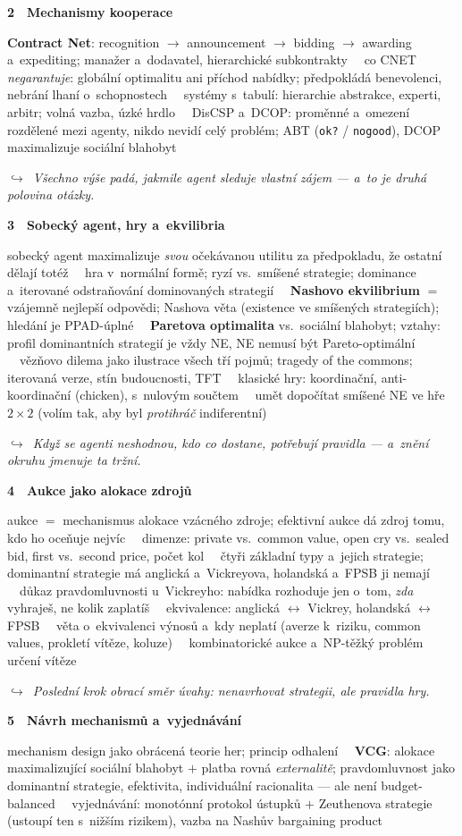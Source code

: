 \documentclass[11pt,a4paper]{article}
\newcommand{\tb}{\ \textcolor{defframe}{\textbullet}\ }
\newcommand{\blok}[2]{\par\addvspace{2.4mm}\noindent
  \textcolor{blokcol}{\textbf{#1}}\ \ \textbf{#2}\par\nobreak}
\newcommand{\tema}[1]{\par\nobreak\noindent #1\par}
\newcommand{\most}[1]{\par\nobreak\noindent
  {\small\itshape\textcolor{mostcol}{$\hookrightarrow$\ #1}}\par}
\begin{document}
\blok{2}{Mechanismy kooperace}
\tema{\textbf{Contract Net}: recognition $\to$ announcement $\to$ bidding $\to$ awarding
a~expediting; manažer a~dodavatel, hierarchické subkontrakty
\tb co CNET \emph{negarantuje}: globální optimalitu ani příchod nabídky; předpokládá
benevolenci, nebrání lhaní o~schopnostech
\tb systémy s~tabulí: hierarchie abstrakce, experti, arbitr; volná vazba, úzké hrdlo
\tb DisCSP a~DCOP: proměnné a~omezení rozdělené mezi agenty, nikdo nevidí celý problém;
ABT (\texttt{ok?} / \texttt{nogood}), DCOP maximalizuje sociální blahobyt}
\most{Všechno výše padá, jakmile agent sleduje vlastní zájem --- a~to je druhá polovina
otázky.}

\blok{3}{Sobecký agent, hry a~ekvilibria}
\tema{sobecký agent maximalizuje \emph{svou} očekávanou utilitu za předpokladu, že ostatní
dělají totéž
\tb hra v~normální formě; ryzí vs.\ smíšené strategie; dominance a~iterované odstraňování
dominovaných strategií
\tb \textbf{Nashovo ekvilibrium} $=$ vzájemně nejlepší odpovědi; Nashova věta (existence ve
smíšených strategiích); hledání je PPAD-úplné
\tb \textbf{Paretova optimalita} vs.\ sociální blahobyt; vztahy: profil dominantních
strategií je vždy NE, NE nemusí být Pareto-optimální
\tb vězňovo dilema jako ilustrace všech tří pojmů; tragedy of the commons; iterovaná verze,
stín budoucnosti, TFT
\tb klasické hry: koordinační, anti-koordinační (chicken), s~nulovým součtem
\tb umět dopočítat smíšené NE ve hře $2\times2$ (volím tak, aby byl \emph{protihráč}
indiferentní)}
\most{Když se agenti neshodnou, kdo co dostane, potřebují pravidla --- a~znění okruhu jmenuje
ta tržní.}

\blok{4}{Aukce jako alokace zdrojů}
\tema{aukce $=$ mechanismus alokace vzácného zdroje; efektivní aukce dá zdroj tomu, kdo ho
oceňuje nejvíc
\tb dimenze: private vs.\ common value, open cry vs.\ sealed bid, first vs.\ second price,
počet kol
\tb čtyři základní typy a~jejich strategie; dominantní strategie má anglická a~Vickreyova,
holandská a~FPSB ji nemají
\tb důkaz pravdomluvnosti u~Vickreyho: nabídka rozhoduje jen o~tom, \emph{zda} vyhraješ,
ne kolik zaplatíš
\tb ekvivalence: anglická $\leftrightarrow$ Vickrey, holandská $\leftrightarrow$ FPSB
\tb věta o~ekvivalenci výnosů a~kdy neplatí (averze k~riziku, common values, prokletí
vítěze, koluze)
\tb kombinatorické aukce a~NP-těžký problém určení vítěze}
\most{Poslední krok obrací směr úvahy: nenavrhovat strategii, ale pravidla hry.}

\blok{5}{Návrh mechanismů a~vyjednávání}
\tema{mechanism design jako obrácená teorie her; princip odhalení
\tb \textbf{VCG}: alokace maximalizující sociální blahobyt $+$ platba rovná
\emph{externalitě}; pravdomluvnost jako dominantní strategie, efektivita, individuální
racionalita --- ale není budget-balanced
\tb vyjednávání: monotónní protokol ústupků $+$ Zeuthenova strategie (ustoupí ten s~nižším
rizikem), vazba na Nashův bargaining product}
\end{document}
